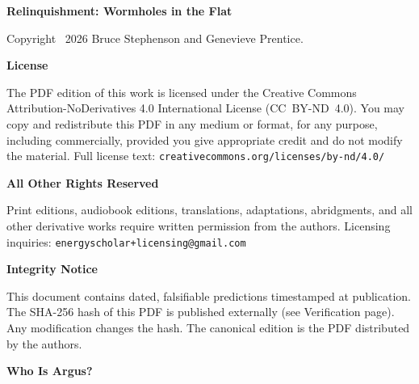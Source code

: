 
\thispagestyle{empty}

\vspace*{\fill}

\begin{flushleft}
\small

\textbf{Relinquishment: Wormholes in the Flat}

\vspace{1cm}

Copyright \textcopyright\ 2026 Bruce Stephenson and Genevieve Prentice.

\vspace{0.8cm}

\textbf{License}

\vspace{0.3cm}

The PDF edition of this work is licensed under the Creative Commons Attribution-NoDerivatives 4.0 International License (CC~BY-ND~4.0). You may copy and redistribute this PDF in any medium or format, for any purpose, including commercially, provided you give appropriate credit and do not modify the material. Full license text: \texttt{creativecommons.org/licenses/by-nd/4.0/}

\vspace{0.5cm}

\textbf{All Other Rights Reserved}

\vspace{0.3cm}

Print editions, audiobook editions, translations, adaptations, abridgments, and all other derivative works require written permission from the authors. Licensing inquiries: \texttt{energyscholar+licensing@gmail.com}

\vspace{0.5cm}

\textbf{Integrity Notice}

\vspace{0.3cm}

This document contains dated, falsifiable predictions timestamped at publication. The SHA-256 hash of this PDF is published externally (see Verification page). Any modification changes the hash. The canonical edition is the PDF distributed by the authors.

\vspace{0.5cm}

\textbf{Who Is Argus?}

\vspace{0.3cm}


\end{flushleft}
